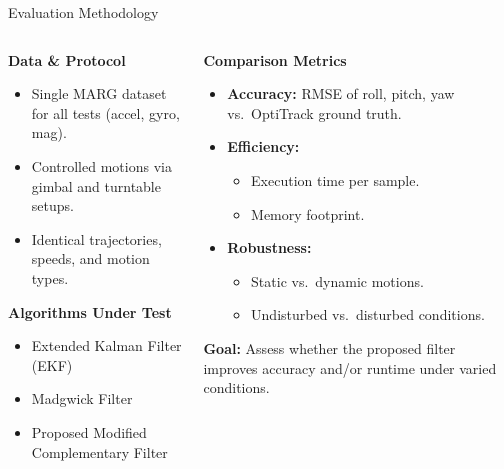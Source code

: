 \documentclass[aspectratio=169,xcolor=dvipsnames]{beamer}
\begin{document}
\begin{frame}{Evaluation Methodology}
\scriptsize
\begin{columns}[T]
  \begin{column}{0.48\textwidth}
    \textbf{Data \& Protocol}
    \begin{itemize}
      \item Single MARG dataset for all tests (accel, gyro, mag).
      \item Controlled motions via gimbal and turntable setups.
      \item Identical trajectories, speeds, and motion types.
    \end{itemize}
    \vspace{0.5em}
    \textbf{Algorithms Under Test}
    \begin{itemize}
      \item Extended Kalman Filter (EKF)
      \item Madgwick Filter
      \item Proposed Modified Complementary Filter
    \end{itemize}
  \end{column}

  \begin{column}{0.48\textwidth}
    \textbf{Comparison Metrics}
    \begin{itemize}
      \item \textbf{Accuracy:} RMSE of roll, pitch, yaw vs.\ OptiTrack ground truth.
      \item \textbf{Efficiency:}
        \begin{itemize}
          \item Execution time per sample.
          \item Memory footprint.
        \end{itemize}
      \item \textbf{Robustness:}
        \begin{itemize}
          \item Static vs.\ dynamic motions.
          \item Undisturbed vs.\ disturbed conditions.
        \end{itemize}
    \end{itemize}
    \vspace{0.5em}
    \textbf{Goal:} Assess whether the proposed filter improves accuracy and/or runtime under varied conditions.
  \end{column}
\end{columns}
\end{frame}
\end{document}
